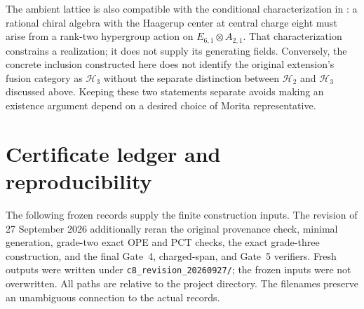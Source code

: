 \documentclass[11pt,a4paper]{article}
\theoremstyle{definition}
\newcommand{\HH}{\mathcal H}
\newcommand{\artifact}[1]{\textnormal{\nolinkurl{#1}}}
\begin{document}
The ambient lattice is also compatible with the conditional
characterization in \cite[Section 4.3]{GR}: a rational chiral algebra
with the Haagerup center at central charge eight must arise from a
rank-two hypergroup action on $E_{6,1}\otimes A_{2,1}$. That
characterization constrains a realization; it does not supply its
generating fields. Conversely, the concrete inclusion constructed here
does not identify the original extension's fusion category as $\HH_3$
without the separate distinction between $\HH_2$ and $\HH_3$ discussed
above. Keeping these two statements separate avoids making an
existence argument depend on a desired choice of Morita representative.

\section{Certificate ledger and reproducibility}\label{sec:ledger}
The following frozen records supply the finite construction inputs.
The revision of 27 September 2026 additionally reran the original
provenance check, minimal generation, grade-two exact OPE and PCT
checks, the exact grade-three construction, and the final Gate~4,
charged-span, and Gate~5 verifiers. Fresh outputs were written under
\artifact{c8_revision_20260927/}; the frozen inputs were not overwritten.
All paths are relative to the project directory. The filenames preserve
an unambiguous connection to the actual records.
\end{document}
